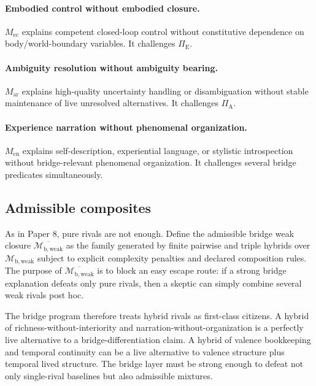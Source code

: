 \documentclass[11pt,a4paper]{article}
\theoremstyle{definition}
\newcommand{\PiA}{\Pi_{\mathrm{A}}}
\newcommand{\PiE}{\Pi_{\mathrm{E}}}
\newcommand{\BridgeWeakFam}{\mathcal{M}_{\mathrm{b,weak}}}
\newcommand{\BridgeWeakClosure}{\overline{\BridgeWeakFam}}
\begin{document}
\paragraph{Embodied control without embodied closure.}
$M_{\mathrm{ec}}$ explains competent closed-loop control without constitutive dependence on body/world-boundary variables. It challenges $\PiE$.

\paragraph{Ambiguity resolution without ambiguity bearing.}
$M_{\mathrm{ar}}$ explains high-quality uncertainty handling or disambiguation without stable maintenance of live unresolved alternatives. It challenges $\PiA$.

\paragraph{Experience narration without phenomenal organization.}
$M_{\mathrm{en}}$ explains self-description, experiential language, or stylistic introspection without bridge-relevant phenomenal organization. It challenges several bridge predicates simultaneously.

\subsection{Admissible composites}
As in Paper 8, pure rivals are not enough. Define the admissible bridge weak closure $\BridgeWeakClosure$ as the family generated by finite pairwise and triple hybrids over $\BridgeWeakFam$ subject to explicit complexity penalties and declared composition rules. The purpose of $\BridgeWeakClosure$ is to block an easy escape route: if a strong bridge explanation defeats only pure rivals, then a skeptic can simply combine several weak rivals post hoc.

The bridge program therefore treats hybrid rivals as first-class citizens. A hybrid of richness-without-interiority and narration-without-organization is a perfectly live alternative to a bridge-differentiation claim. A hybrid of valence bookkeeping and temporal continuity can be a live alternative to valence structure plus temporal lived structure. The bridge layer must be strong enough to defeat not only single-rival baselines but also admissible mixtures.
\end{document}
